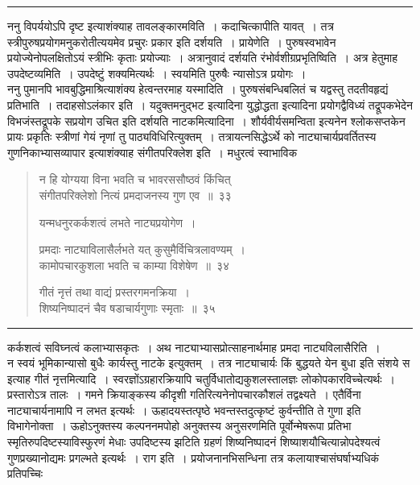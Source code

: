 \documentclass[11pt, openany]{book}
\begin{document}
\hrule

\vspace{2mm}
ननु विपर्ययोऽपि दृष्ट इत्याशंक्याह तावलङ्कारमविति~। कदाचित्कापीति यावत्~। तत्र स्त्रीपुरुषप्रयोगमनुकरोतीत्ययमेव प्रचुरः प्रकार इति दर्शयति~। प्रायेणेति~। पुरुषस्वभावेन प्रयोज्येनोपलक्षितोऽयं स्त्रीभिः कृताः प्रयोज्याः~। अत्रानुवादं दर्शयति रंभोर्वशीग्रप्रभृतिष्विति~। अत्र हेतुमाह उपदेष्टव्यमिति~। उपदेष्टुं शक्यमित्यर्थः~। स्वयमिति पुरुषैः न्यासोऽत्र प्रयोगः~।\\

ननु पुमानपि भावबुद्धिमाश्रित्याशंक्य हेत्वन्तरमाह यस्मादिति~। पुरुषसंबन्धिबलितं च यद्वस्तु तदतीवहृद्यं प्रतिभाति~। तदाहसोऽलंकार इति~। यदुक्तमनुद्भट इत्यादिना युद्धोद्धता इत्यादिना प्रयोगद्वैविध्यं तद्रूपकभेदेन विभजंस्तद्रूपके सप्रयोग उचित इति दर्शयति नाटकमित्यादिना~। शौर्यवीर्यसमन्विता इत्यनेन श्लोकसप्तकेन प्रायः प्रकृतिः स्त्रीणां गेयं नृणां तु पाठ्यविधिरित्युक्तम्~। तत्रायत्नसिद्धेऽर्थे को नाट्याचार्यप्रवर्तितस्य गुणनिकाभ्यासव्यापार इत्याशंक्याह संगीतपरिक्लेश इति~। मधुरत्वं स्वाभाविक 

\newpage

\begin{quote}
{\na न हि योग्यया विना भवति च भावरससौष्ठवं किंचित्\\
संगीतपरिक्लेशो नित्यं प्रमदाजनस्य गुण एव~॥~३३

यन्मधनुरकर्कशत्वं लभते नाट्यप्रयोगेण~।

प्रमदाः नाट्याविलासैर्लभते यत् कुसुमैर्विचित्रलावण्यम्~।\\
कामोपचारकुशला भवति च काम्या विशेषेण~॥~३४

गीतं नृत्तं तथा वाद्यं प्रस्तरगमनक्रिया~।\\
शिष्यनिष्पादनं चैव षडाचार्यगुणाः स्मृताः~॥~३५}
\end{quote}

\hrule

\vspace{2mm}
\noindent
कर्कशत्वं सविघ्नत्वं कलाभ्यासकृतः~। अथ नाट्याभ्यासप्रोत्साहनार्थमाह प्रमदा नाट्यविलासैरिति~।\\

न स्वयं भूमिकान्यासो बुधैः कार्यस्तु नाटके इत्युक्तम्~। तत्र नाट्याचार्यः किं बुद्धयते येन बुधा इति संशये स इत्याह गीतं नृत्तमित्यादि~। स्वरज्ञोंऽग्रहारक्रियापि चतुर्विधातोद्यकुशलस्तालज्ञः लोकोपकारविच्चेत्यर्थः~। प्रस्तारोऽत्र तालः~। गमने क्रियाङ्कस्य कीदृशी गतिरित्यनेनोपचारकौशलं तद्वक्ष्यते~। एतैर्विना नाट्याचार्यनामापि न लभत इत्यर्थः~। ऊहादयस्तत्पृष्ठे भवन्तस्तदुत्कृष्टं कुर्वन्तीति ते गुणा इति विभागेनोक्ता~। ऊहोऽनुक्तस्य कल्पननमपोहो अनुक्तस्य अनुसरणमिति पूर्वोन्मेषरूपा प्रतिभा स्मृतिरुपदिष्टस्याविस्फुरणं मेधाः उपदिष्टस्य झटिति ग्रहणं शिष्यनिष्पादनं शिष्याशयौचित्यान्नोपदेश्यत्वं गुणप्रख्यानोद्यमः प्रगल्भते इत्यर्थः~। राग इति~। प्रयोजनानभिसन्धिना तत्र कलायाश्चासंघर्षाभ्यधिकं प्रतिपच्चिः
\end{document}
